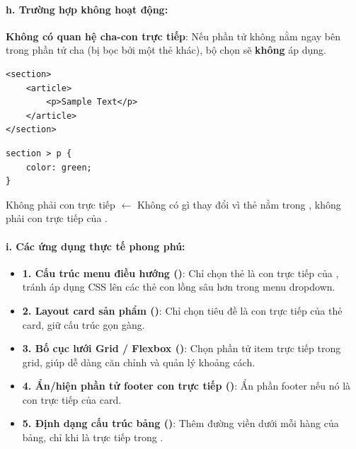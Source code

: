 \paragraph{h. Trường hợp không hoạt động:}

\begin{warnBox}
\textbf{Không có quan hệ cha-con trực tiếp}: Nếu phần tử không nằm ngay bên trong phần tử cha (bị bọc bởi một thẻ khác), bộ chọn \codeinline{>} sẽ \textbf{không} áp dụng.
\end{warnBox}

\begin{codeWindow}
\begin{lstlisting}[language=HTML5]
<section>
    <article>
        <p>Sample Text</p>
    </article>
</section>
\end{lstlisting}

\begin{lstlisting}[language=CSS3]
section > p {
    color: green;
}
\end{lstlisting}
\end{codeWindow}

\begin{browserWindow}
\sffamily\small
\textcolor{darkText}{Không phải con trực tiếp} {\small\textcolor{gray!60}{$\leftarrow$ Không có gì thay đổi vì thẻ  nằm trong , không phải con trực tiếp của .}}
\end{browserWindow}

\paragraph{i. Các ứng dụng thực tế phong phú:}

\begin{tipBox}
\begin{itemize}[leftmargin=1.5em, itemsep=3pt, parsep=0pt]
    \item \textbf{1. Cấu trúc menu điều hướng ()}: Chỉ chọn thẻ  là con trực tiếp của , tránh áp dụng CSS lên các thẻ con lồng sâu hơn trong menu dropdown.
    \item \textbf{2. Layout card sản phẩm ()}: Chỉ chọn tiêu đề là con trực tiếp của thẻ card, giữ cấu trúc gọn gàng.
    \item \textbf{3. Bố cục lưới Grid / Flexbox ()}: Chọn phần tử item trực tiếp trong grid, giúp dễ dàng căn chỉnh và quản lý khoảng cách.
    \item \textbf{4. Ẩn/hiện phần tử footer con trực tiếp ()}: Ẩn phần footer nếu nó là con trực tiếp của card.
    \item \textbf{5. Định dạng cấu trúc bảng ()}: Thêm đường viền dưới mỗi hàng của bảng, chỉ khi là trực tiếp trong .
\end{itemize}
\end{tipBox}

